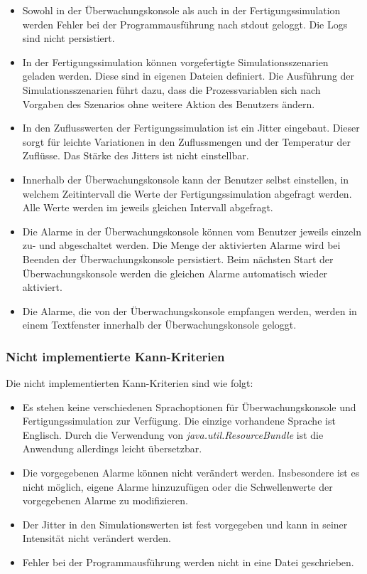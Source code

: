 \documentclass[parskip=full]{scrartcl}
\begin{document}
\begin{itemize}
    \item Sowohl in der \"Uberwachungskonsole als auch in der Fertigungssimulation werden Fehler bei der Programmausf\"uhrung
    nach stdout geloggt. Die Logs sind nicht persistiert.
    \item In der Fertigungssimulation k\"onnen vorgefertigte Simulationsszenarien geladen werden. Diese sind in eigenen Dateien definiert.
    Die Ausführung der Simulationsszenarien f\"uhrt dazu, dass die Prozessvariablen sich nach Vorgaben des Szenarios ohne
    weitere Aktion des Benutzers \"andern.
    \item In den Zuflusswerten der Fertigungssimulation ist ein Jitter eingebaut. Dieser sorgt f\"ur leichte Variationen in den
    Zuflussmengen und der Temperatur der Zufl\"usse. Das Stärke des Jitters ist nicht einstellbar.
    \item Innerhalb der \"Uberwachungskonsole kann der Benutzer selbst einstellen, in welchem Zeitintervall die Werte der
    Fertigungssimulation abgefragt werden. Alle Werte werden im jeweils gleichen Intervall abgefragt.
    \item Die Alarme in der \"Uberwachungskonsole k\"onnen vom Benutzer jeweils einzeln zu- und abgeschaltet werden. Die Menge der
    aktivierten Alarme wird bei Beenden der \"Uberwachungskonsole persistiert. Beim n\"achsten Start der \"Uberwachungskonsole
    werden die gleichen Alarme automatisch wieder aktiviert.
    \item Die Alarme, die von der \"Uberwachungskonsole empfangen werden, werden in einem Textfenster innerhalb der
    \"Uberwachungskonsole geloggt.
\end{itemize}

\subsubsection{Nicht implementierte Kann-Kriterien}
Die nicht implementierten Kann-Kriterien sind wie folgt:

\begin{itemize}
    \item Es stehen keine verschiedenen Sprachoptionen f\"ur \"Uberwachungskonsole und Fertigungssimulation zur Verf\"ugung.
    Die einzige vorhandene Sprache ist Englisch. Durch die Verwendung von \emph{java.util.ResourceBundle} ist die Anwendung allerdings leicht übersetzbar.
    \item Die vorgegebenen Alarme k\"onnen nicht ver\"andert werden. Insbesondere ist es nicht m\"oglich, eigene Alarme hinzuzuf\"ugen
    oder die Schwellenwerte der vorgegebenen Alarme zu modifizieren.
    \item Der Jitter in den Simulationswerten ist fest vorgegeben und kann in seiner Intensit\"at nicht ver\"andert werden.
    \item Fehler bei der Programmausf\"uhrung werden nicht in eine Datei geschrieben.
\end{itemize}
\end{document}
